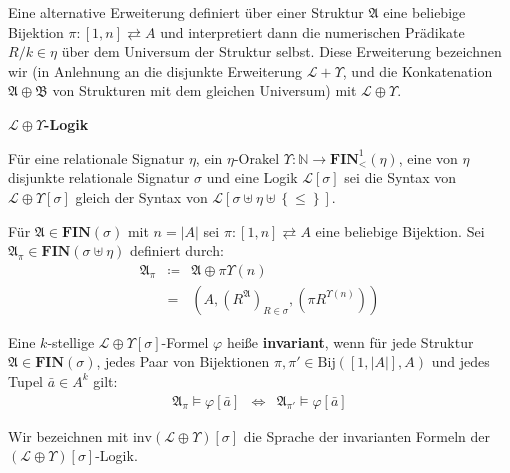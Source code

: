 Eine alternative Erweiterung definiert über einer Struktur $\mathfrak{A}$
eine beliebige Bijektion $\pi:\left[1,n\right]\rightleftarrows A$
und interpretiert dann die numerischen Prädikate $R/k\in\eta$ über
dem Universum der Struktur selbst. Diese Erweiterung bezeichnen wir
(in Anlehnung an die disjunkte Erweiterung $\mathcal{L}+\Upsilon$,
und die Konkatenation $\mathfrak{A}\oplus\mathfrak{B}$ von Strukturen
mit dem gleichen Universum) mit $\mathcal{L}\oplus\Upsilon$.
\begin{defn}
\textbf{$\mathcal{L}\oplus\Upsilon$-Logik}

Für eine relationale Signatur $\eta$, ein $\eta$-Orakel $\Upsilon:\mathbb{N}\rightarrow\mathbf{FIN}_{<}^{1}\left(\eta\right)$,
eine von $\eta$ disjunkte relationale Signatur $\sigma$ und eine
Logik $\mathcal{L}\left[\sigma\right]$ sei die Syntax von $\mathcal{L}\oplus\Upsilon\left[\sigma\right]$
gleich der Syntax von $\mathcal{L}\left[\sigma\uplus\eta\uplus\left\{ \leqslant\right\} \right]$.

Für $\mathfrak{A}\in\mathbf{FIN}\left(\sigma\right)$ mit $n=\left|A\right|$
sei $\pi:\left[1,n\right]\rightleftarrows A$ eine beliebige Bijektion.
Sei $\mathfrak{A}_{\pi}\in\mathbf{FIN}\left(\sigma\uplus\eta\right)$
definiert durch:
\begin{eqnarray*}
\mathfrak{A}_{\pi} & \coloneqq & \mathfrak{A}\oplus\pi\Upsilon\left(n\right)\\
 & = & \left(A,\left(R^{\mathfrak{A}}\right)_{R\in\sigma},\left(\pi R^{\Upsilon\left(n\right)}\right)\right)
\end{eqnarray*}

Eine $k$-stellige $\mathcal{L}\oplus\Upsilon\left[\sigma\right]$-Formel
$\varphi$ heiße \textbf{invariant}, wenn für jede Struktur $\mathfrak{A}\in\mathbf{FIN}\left(\sigma\right)$,
jedes Paar von Bijektionen $\pi,\pi'\in\mathrm{Bij}\left(\left[1,\left|A\right|\right],A\right)$
und jedes Tupel $\bar{a}\in A^{k}$ gilt:
\begin{eqnarray*}
\mathfrak{A}_{\pi}\models\varphi\left[\bar{a}\right] & \Longleftrightarrow & \mathfrak{A}_{\pi'}\models\varphi\left[\bar{a}\right]
\end{eqnarray*}

Wir bezeichnen mit $\mathrm{inv}\left(\mathcal{L}\oplus\Upsilon\right)\left[\sigma\right]$
die Sprache der invarianten Formeln der $\left(\mathcal{L}\oplus\Upsilon\right)\left[\sigma\right]$-Logik.
\end{defn}

